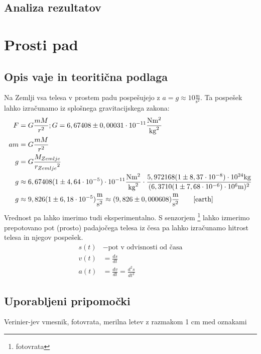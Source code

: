 \documentclass[12pt]{article}
\begin{document}
	\subsection*{Analiza rezultatov}

\newpage
\section{Prosti pad}
 	\subsection*{Opis vaje in teoritična podlaga}
	Na Zemlji vsa telesa v prostem padu pospešujejo z $ a = g \approx 10 \frac{\text{m}}{{\text{s}}^2}$.
	Ta pospešek lahko izračunamo iz splošnega gravitacijskega zakona:
	\begin{equation}
		\label{gravity}
		\begin{split}
			F &= G \frac{mM}{r^2}; G = 6,67408 \pm 0,00031 \cdot 10^{-11} \frac{\text{N}\text{m}^2}{\text{kg}^2} \\
			a m &= G \frac{mM}{r^2} \\
			g &= G \frac{M_{Zemlje}}{{r_{Zemlje}}^2} \\
			g &\approx 6,67408 (1 \pm 4,64 \cdot 10^{-5}) \cdot 10^{-11} \frac{\text{N}\text{m}^2}{\text{kg}^2} \cdot \frac{5,972168 (1 \pm 8,37 \cdot 10 ^{-8}) \cdot 10^{24} \text{kg} }{(6,3710 (1 \pm 7,68 \cdot 10^{-6}) \cdot 10^6 \text{m}) ^2} \\
			g &\approx 9,826 (1 \pm 6,18 \cdot 10^{-5}) \frac{\text{m}}{\text{s}^2} \approx (9,826 \pm 0,000608) \frac{\text{m}}{\text{s}^2} \qquad \mbox{\cite{earth}}
		\end{split}
	\end{equation}
	Vrednost pa lahko imerimo tudi eksperimentalno. S senzorjem \footnote{fotovrata} lahko
	izmerimo prepotovano pot (prosto) padajočega telesa iz česa pa lahko izračunamo hitrost
	telesa in njegov pospešek.
	\begin{equation}
		\begin{split}
			s(t) &- \text{pot v odvisnosti od časa} \\
			v(t) &= \frac{ds}{dt} \\
			a(t) &= \frac{dv}{dt} = \frac{d^2s}{{dt}^2}
		\end{split}	
	\end{equation}


 	\subsection*{Uporabljeni pripomočki}
	Verinier-jev vmesnik, fotovrata, merilna letev z razmakom 1 cm med oznakami
	\vspace{\fill}
\end{document}
